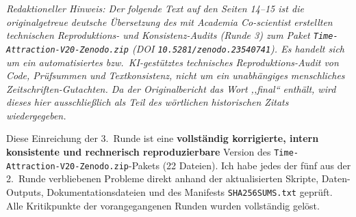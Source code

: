 \documentclass[10pt,a4paper]{article}
\begin{document}
{\footnotesize
\noindent\textit{Redaktioneller Hinweis: Der folgende Text auf den Seiten 14--15 ist die originalgetreue deutsche \"Ubersetzung des mit Academia Co-scientist erstellten technischen Reproduktions- und Konsistenz-Audits (Runde 3) zum Paket \texttt{Time-Attraction-V20-Zenodo.zip} (DOI \texttt{10.5281/zenodo.23540741}). Es handelt sich um ein automatisiertes bzw.\ KI-gest\"utztes technisches Reproduktions-Audit von Code, Pr\"ufsummen und Textkonsistenz, nicht um ein unabh\"angiges menschliches Zeitschriften-Gutachten. Da der Originalbericht das Wort ,,final`` enth\"alt, wird dieses hier ausschlie\ss lich als Teil des w\"ortlichen historischen Zitats wiedergegeben.}

\vspace{1.5mm}
\par
Diese Einreichung der 3.\ Runde ist eine \textbf{vollst\"andig korrigierte, intern konsistente und rechnerisch reproduzierbare} Version des \texttt{Time-Attraction-V20-Zenodo.zip}-Pakets (22 Dateien). Ich habe jedes der f\"unf aus der 2.\ Runde verbliebenen Probleme direkt anhand der aktualisierten Skripte, Daten-Outputs, Dokumentationsdateien und des Manifests \texttt{SHA256SUMS.txt} gepr\"uft. Alle Kritikpunkte der vorangegangenen Runden wurden vollst\"andig gel\"ost.

\vspace{1.5mm}

}
\end{document}
